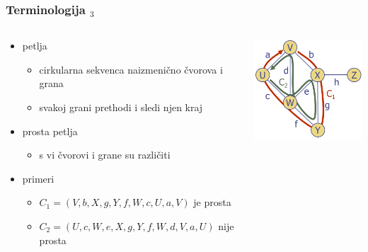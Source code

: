 \documentclass[compress,aspectratio=169]{beamer}
\begin{document}
\begin{frame}[fragile]
  \frametitle{Terminologija $_{3}$}
  \begin{columns}
    \begin{column}[t]{9cm}
      \begin{itemize}
        \item petlja
        \begin{itemize}
          \item cirkularna sekvenca naizmenično čvorova i grana
          \item svakoj grani prethodi i sledi njen kraj
        \end{itemize}
        \item prosta petlja
        \begin{itemize}
          \item s vi čvorovi i grane su različiti
        \end{itemize}
        \item primeri
        \begin{itemize}
          \item $C_{1}=(V,b,X,g,Y,f,W,c,U,a,V)$ je prosta
          \item $C_{2}=(U,c,W,e,X,g,Y,f,W,d,V,a,U)$ nije prosta
        \end{itemize}
      \end{itemize}
    \end{column}
    \begin{column}[t]{4.5cm}
      \begin{center}
        \includegraphics[width=4.5cm]{asp-14-pic06.png}
      \end{center}
    \end{column}
  \end{columns}
\end{frame}
\end{document}
